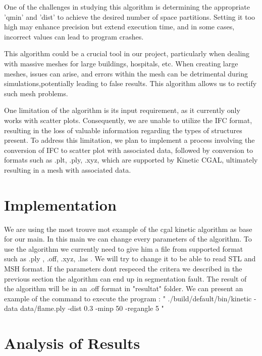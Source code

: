 \documentclass{article}
\begin{document}
  One of the challenges in studying this algorithm is determining the appropriate 'qmin' and 'dist' to achieve the desired number of space partitions.
  Setting it too high may enhance precision but extend execution time, and in some cases, incorrect values can lead to program crashes.

This algorithm could be a crucial tool in our project, particularly when dealing with massive meshes for large buildings,
hospitals, etc. When creating large meshes, issues can arise, and errors within the mesh can be detrimental during simulations,potentially leading to false results. 
This algorithm allows us to rectify such mesh problems.

One limitation of the algorithm is its input requirement, as it currently only works with scatter plots. Consequently, we are unable to utilize the IFC format, 
resulting in the loss of valuable information regarding the types of structures present. To address this limitation, 
we plan to implement a process involving the conversion of IFC to scatter plot with associated data, followed by conversion to formats such as .plt, .ply, .xyz,
which are supported by Kinetic CGAL, ultimately resulting in a mesh with associated data.


\section{Implementation}

We are using the most trouve mot example of the cgal kinetic algorithm as base for our main. In this main we can change every parameters of the algorithm.
\newline
To use the algorithm we currently need to give him a file from supported format such as .ply , .off, .xyz, .las .
We will try to change it to be able to read STL and MSH format.
If the parameters dont respeced the critera we described in the previous section the algorithm can end up in segmentation fault.
The result of the algorithm will be in an .off format in "resultat" folder.
\newline
We can present an example of the command to execute the program :
\newline
" ./build/default/bin/kinetic -data data/flame.ply -dist 0.3 -minp 50 -regangle 5  "
\newline
\section{Analysis of Results}
\end{document}
